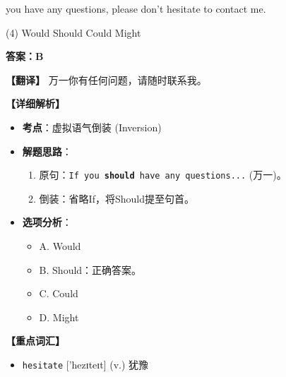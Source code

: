 \documentclass[11pt, a4paper]{article}
\newcommand{\analysis}[4]{
    \begin{solutionbox}
        \textbf{答案：#1}
        
        \textbf{【翻译】} #2
        
        \textbf{【详细解析】}
        #3
        
        \textbf{【重点词汇】}
        #4
    \end{solutionbox}
}
\newcommand{\blank}{\underline{\hspace{1.5cm}}}
\begin{document}
\begin{questions}
    \item \blank you have any questions, please don't hesitate to contact me.
    \begin{tasks}(4)
        \task Would \task Should \task Could \task Might
    \end{tasks}
    \analysis{B}{万一你有任何问题，请随时联系我。}{
        \begin{itemize}
            \item \textbf{考点}：虚拟语气倒装 (Inversion)
            \item \textbf{解题思路}：
                \begin{enumerate}
                    \item 原句：\texttt{If you \textbf{should} have any questions...} (万一)。
                    \item 倒装：省略If，将Should提至句首。
                \end{enumerate}
            \item \textbf{选项分析}：
                \begin{itemize}
                    \item A. Would
                    \item B. Should：正确答案。
                    \item C. Could
                    \item D. Might
                \end{itemize}
        \end{itemize}
    }{
        \begin{itemize}
            \item \texttt{hesitate} ['hezɪteɪt] (v.) 犹豫
        \end{itemize}
    }


\end{questions}
\end{document}
